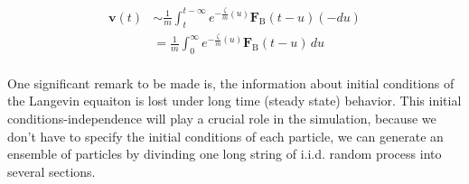 \documentclass[10pt]{article}
\begin{document}
\begin{equation}\label{eqn:v_longtime_new}
    \begin{split}
        \mathbf{v}(t)&\sim\frac{1}{m}\int_{t}^{t-\infty}e^{-\frac{\zeta}{m}(u)}\mathbf{F}_\text{B}(t-u)(-du)\\
    &=\frac{1}{m}\int_{0}^{\infty}e^{-\frac{\zeta}{m}(u)}\mathbf{F}_\text{B}(t-u)\,du
    \end{split}
\end{equation}
\\ \hspace*{\parindent}
One significant remark to be made is, the information about initial conditions of the Langevin equaiton is lost under
long time (steady state) behavior. This initial conditions-independence will play a crucial role in the simulation, because we don't have to specify
the initial conditions of each particle, we can generate an ensemble of particles by divinding one long string of i.i.d. random process into several sections.
\end{document}
